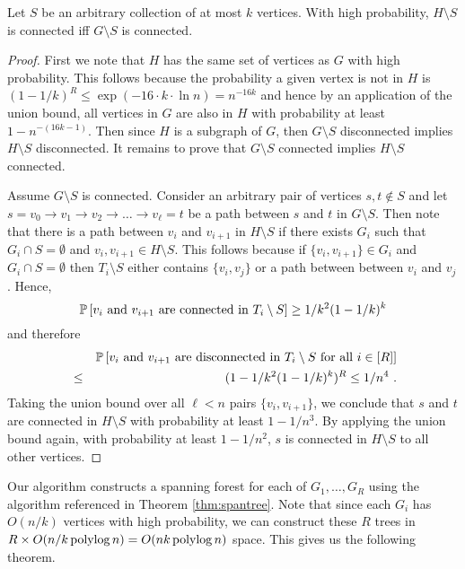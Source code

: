 \begin{lemma}
Let $S$ be an arbitrary collection of at most $k$ vertices. With high probability, $H\setminus S$ is connected iff $G\setminus S$ is connected.
\end{lemma}

\begin{proof}
First we note that $H$ has the same set of vertices as $G$ with high probability. This follows because the probability a given vertex is not in $H$ is $(1-1/k)^R\leq \exp(-16\cdot k \cdot \ln n)=n^{-16k}$ and hence by an application of the union bound, all vertices in $G$ are also in $H$ with probability at least $1-n^{-(16k-1)}$. Then since $H$ is a subgraph of $G$, then $G\setminus S$ disconnected implies  $H\setminus S$ disconnected. It remains to prove that $G\setminus S$ connected implies $H\setminus S$ connected.

Assume $G\setminus S$ is connected. Consider an arbitrary pair of vertices $s,t \not \in S$ and let 
$s=v_0\rightarrow v_1 \rightarrow v_2 \rightarrow \ldots \rightarrow v_\ell=t$
be a  path between $s$ and $t$ in $G\setminus S$.
Then note that there is a path between $v_i$ and $v_{i+1}$ in $H\setminus S$ if there exists $G_i$ such that $G_i\cap S=\emptyset$ and $v_i,v_{i+1}\in H\setminus S$. This follows because if $\{v_i,v_{i+1}\}\in G_i$ and $G_i\cap S=\emptyset$ then $T_i\setminus S$ either contains $\{v_i,v_j\}$ or a path between between $v_i$ and $v_j$. Hence,
\[
\mathbb P \left [ \mbox{$v_i$ and $v_{i+1}$ are connected in $T_i\setminus S$} \right ] \geq 1/k^2 (1-1/k)^k
\]
and therefore 
\begin{eqnarray*}
& & \mathbb P \left [ \mbox{$v_i$ and $v_{i+1}$ are disconnected in $T_i\setminus S$ for all $i\in [R]$} \right ] \\
&\leq & (1-1/k^2 (1-1/k)^k)^R 
\leq 1/n^4 \ .
\end{eqnarray*}
Taking the union bound over all $\ell <n$ pairs $\{v_i, v_{i+1}\}$, we conclude that 
$s$ and $t$ are connected in $H\setminus S$ with probability at least $1-1/n^3$. By applying the union bound again, with probability at least $1-1/n^2$, $s$ is connected in $H\setminus S$ to all other vertices.
\end{proof}

Our algorithm constructs a spanning forest for each of $G_1, \ldots, G_R$ using the algorithm referenced in Theorem \ref{thm:spantree}. Note that since each $G_i$ has $O(n/k)$ vertices with high probability, we can construct these $R$ trees in $R\times O(n/k \operatorname{polylog} n)=O(nk\operatorname{polylog} n)$ space. This gives us the following theorem.

